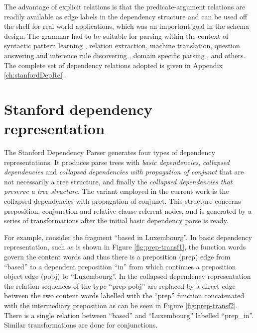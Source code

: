     The advantage of explicit relations is that the predicate-argument relations are readily available as edge labels in the dependency structure and can be used off the shelf for real world applications, which was an important goal in the schema design. The grammar had to be suitable for parsing within the context of syntactic pattern learning \citep{snow2005learning}, relation extraction, machine translation, question answering and inference rule discovering \citep{lin2001discovery}, domain specific parsing \citep{clegg2007benchmarking}, and others. The complete set of dependency relations adopted is given in Appendix \ref{ch:stanfordDepRel}.

\section{Stanford dependency representation}
\label{sec:collapsed-cc-output}
    The Stanford Dependency Parser generates four types of dependency representations. It produces parse trees with \textit{basic dependencies}, \textit{collapsed dependencies} and \textit{collapsed dependencies with propagation of conjunct} that are not necessarily a tree structure, and finally the \textit{collapsed dependencies that preserve a tree structure}. The variant employed in the current work is the collapsed dependencies with propagation of conjunct. This structure concerns preposition, conjunction and relative clause referent nodes, and is generated by a series of transformations after the initial basic dependency parse is ready.

    For example, consider the fragment ``based in Luxembourg''. In basic dependency representation, such as is shown in Figure \ref{fig:prep-transf1}, the function words govern the content words and thus there is a preposition (prep) edge from ``based'' to a dependent preposition ``in'' from which continues a preposition object edge (pobj) to ``Luxembourg''. In the collapsed dependency representation the relation sequences of the type ``prep-pobj'' are replaced by a direct edge between the two content words labelled with the ``prep'' function concatenated with the intermediary preposition as can be seen in Figure \ref{fig:prep-transf2}. There is a single relation between ``based'' and ``Luxembourg'' labelled ``prep\_in''. Similar transformations are done for conjunctions.

